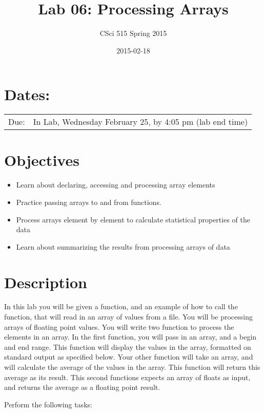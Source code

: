 \documentclass[11pt]{article}
\title{Lab 06: Processing Arrays}
\author{CSci 515 Spring 2015}
\date{2015-02-18}
\begin{document}
\maketitle


\section*{Dates:}
\label{sec-1}


\begin{center}
\begin{tabular}{ll}
 Due:  &  In Lab, Wednesday February 25, by 4:05 pm (lab end time)  \\
\end{tabular}
\end{center}
\section*{Objectives}
\label{sec-2}

\begin{itemize}
\item Learn about declaring, accessing and processing array elements
\item Practice passing arrays to and from functions.
\item Process arrays element by element to calculate statistical properties of the data
\item Learn about summarizing the results from processing arrays of data
\end{itemize}
\section*{Description}
\label{sec-3}

In this lab you will be given a function, and an example of how to call the function, that will
read in an array of values from a file. You will be processing arrays of floating point values.
You will write two function to process the elements in an array.  In the first function, you
will pass in an array, and a begin and end range.  This function will display the values
in the array, formatted on standard output as specified below.  Your other function will
take an array, and will calculate the average of the values in the array.  This function will
return this average as its result.  This second functions expects an array of floats as input,
and returns the average as a floating point result.


Perform the following tasks:
\end{document}
